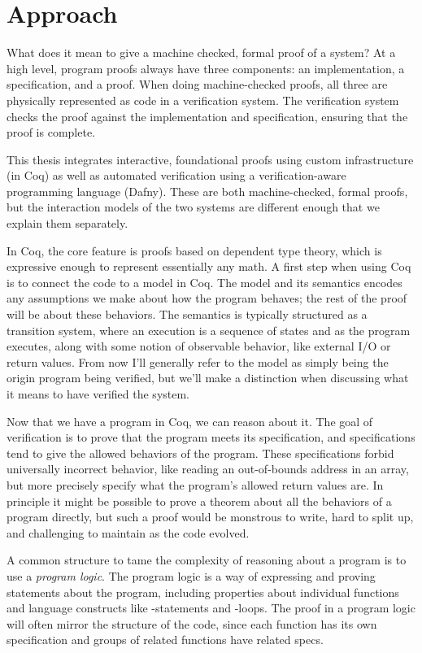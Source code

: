 \section{Approach}

What does it mean to give a machine checked, formal proof of a system? At a high
level, program proofs always have three components: an implementation, a
specification, and a proof. When doing machine-checked proofs, all three are
physically represented as code in a verification system. The verification system
checks the proof against the implementation and specification, ensuring that the
proof is complete.

This thesis integrates interactive, foundational proofs using custom
infrastructure (in Coq) as well as automated verification using a
verification-aware programming language (Dafny). These are both machine-checked,
formal proofs, but the interaction models of the two systems are different
enough that we explain them separately.

In Coq, the core feature is proofs based on dependent type theory, which is
expressive enough to represent essentially any math. A first step when using Coq
is to connect the code to a model in Coq. The model and its semantics encodes any
assumptions we make about how the program behaves; the rest of the proof will be
about these behaviors. The semantics is typically structured as a transition
system, where an execution is a sequence of states and as the program executes,
along with some notion of observable behavior, like external I/O or return
values. From now I'll generally refer to the model as simply being the origin
program being verified,
but we'll make a distinction when discussing what it means to have verified
the system.

Now that we have a program in Coq, we can reason about it. The goal of
verification is to prove that the program meets its specification, and
specifications tend to give the allowed behaviors of the program. These
specifications forbid universally incorrect behavior, like reading an
out-of-bounds address in an array, but more precisely specify what the program's
allowed return values are. In principle it might be possible to prove a theorem
about all the behaviors of a program directly, but such a proof would be
monstrous to write, hard to split up, and challenging to maintain as the code
evolved.

A common structure to tame the complexity of reasoning about a program is to use
a \emph{program logic}. The program logic is a way of expressing and proving
statements about the program, including properties about individual functions
and language constructs like -statements and -loops. The proof
in a program logic will often mirror the structure of the code, since each
function has its own specification and groups of related functions have related
specs.

